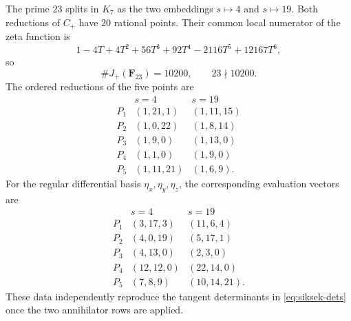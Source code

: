 \documentclass[11pt]{article}
\newcommand{\F}{\mathbf F}
\theoremstyle{definition}
\theoremstyle{remark}
\begin{document}
The prime $23$ splits in $K_7$ as the two embeddings $s\mapsto4$ and
$s\mapsto19$.  Both reductions of $C_+$ have $20$ rational points.  Their
common local numerator of the zeta function is
\[
 1-4T+4T^2+56T^3+92T^4-2116T^5+12167T^6,
\]
so
\[
                      \#J_+(\F_{23})=10200,\qquad 23\nmid10200.
\]
The ordered reductions of the five points are
\[
\begin{array}{c|cc}
&s=4&s=19\\ \hline
P_1&(1,21,1)&(1,11,15)\\
P_2&(1,0,22)&(1,8,14)\\
P_3&(1,9,0)&(1,13,0)\\
P_4&(1,1,0)&(1,9,0)\\
P_5&(1,11,21)&(1,6,9).
\end{array}
\]
For the regular differential basis $\eta_x,\eta_y,\eta_z$, the corresponding
evaluation vectors are
\[
\begin{array}{c|cc}
&s=4&s=19\\ \hline
P_1&(3,17,3)&(11,6,4)\\
P_2&(4,0,19)&(5,17,1)\\
P_3&(4,13,0)&(2,3,0)\\
P_4&(12,12,0)&(22,14,0)\\
P_5&(7,8,9)&(10,14,21).
\end{array}
\]
These data independently reproduce the tangent determinants in
\eqref{eq:siksek-dets} once the two annihilator rows are applied.


\end{document}
